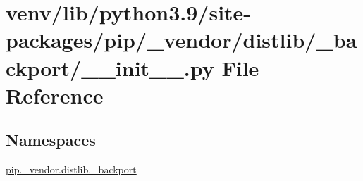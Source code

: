 \hypertarget{venv_2lib_2python3_89_2site-packages_2pip_2__vendor_2distlib_2__backport_2____init_____8py}{}\section{venv/lib/python3.9/site-\/packages/pip/\+\_\+vendor/distlib/\+\_\+backport/\+\_\+\+\_\+init\+\_\+\+\_\+.py File Reference}
\label{venv_2lib_2python3_89_2site-packages_2pip_2__vendor_2distlib_2__backport_2____init_____8py}
\subsection*{Namespaces}
\begin{DoxyCompactItemize}
\item 
 \hyperlink{namespacepip_1_1__vendor_1_1distlib_1_1__backport}{pip.\+\_\+vendor.\+distlib.\+\_\+backport}
\end{DoxyCompactItemize}
